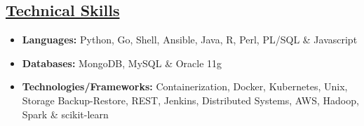 \documentclass[10pt]{article}
\begin{document}
\subsection*{\underline{Technical Skills}}
\vspace{-0.1cm}
\begin{itemize}[leftmargin=*]
 \item[]  \textbf{Languages:}  Python, Go, Shell, Ansible, Java, R, Perl, PL/SQL \& Javascript
 \vspace{-0.22cm}
 \item[]   \textbf{Databases:} MongoDB, MySQL \& Oracle 11g
  \vspace{-0.22cm}
 \item[]   \textbf{Technologies/Frameworks:} Containerization, Docker, Kubernetes, Unix, Storage Backup-Restore, REST, Jenkins, Distributed Systems, AWS, Hadoop, Spark \& scikit-learn
\end{itemize}
\end{document}
